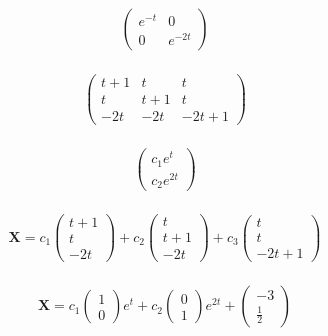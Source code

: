 \documentclass{article}
\begin{document}
\[\begin{pmatrix}
    e^{-t} & 0        \\
    0      & e^{-2 t}
  \end{pmatrix}\]

\setcounter{subsubsection}{2}
\subsubsection{}

\[\begin{pmatrix}
    t + 1 & t     & t        \\
    t     & t + 1 & t        \\
    -2 t  & -2 t  & -2 t + 1
  \end{pmatrix}\]

\setcounter{subsubsection}{4}
\subsubsection{}

\[\begin{pmatrix}
    c_1 e^t \\
    c_2 e^{2 t}
  \end{pmatrix}\]

\setcounter{subsubsection}{6}
\subsubsection{}

\[\mathbf{X} = c_1 \begin{pmatrix}
    t + 1 \\
    t     \\
    -2 t
  \end{pmatrix} + c_2 \begin{pmatrix}
    t     \\
    t + 1 \\
    -2 t
  \end{pmatrix} + c_3 \begin{pmatrix}
    t \\
    t \\
    -2 t + 1
  \end{pmatrix}\]

\setcounter{subsubsection}{8}
\subsubsection{}

\[\mathbf{X} = c_1 \begin{pmatrix}
    1 \\
    0
  \end{pmatrix} e^t + c_2 \begin{pmatrix}
    0 \\
    1
  \end{pmatrix} e^{2 t} + \begin{pmatrix}
    -3 \\
    \frac{1}{2}
  \end{pmatrix}\]
\end{document}
